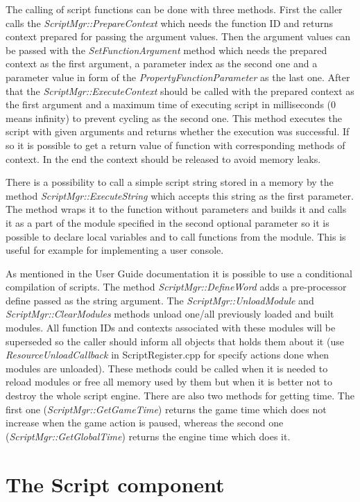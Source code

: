 \documentclass[a4paper, 12pt]{report}
\begin{document}
The calling of script functions can be done with three methods. First the caller calls the \emph{ScriptMgr::PrepareContext} which needs the function ID and returns context prepared for passing the argument values. Then the argument values can be passed with the \emph{SetFunctionArgument} method which needs the prepared context as the first argument, a parameter index as the second one and a parameter value in form of the \emph{PropertyFunctionParameter} as the last one. After that the \emph{ScriptMgr::ExecuteContext} should be called with the prepared context as the first argument and a maximum time of executing script in milliseconds (0 means infinity) to prevent cycling as the second one. This method executes the script with given arguments and returns whether the execution was successful. If so it is possible to get a return value of function with corresponding methods of context. In the end the context should be released to avoid memory leaks.

There is a possibility to call a simple script string stored in a memory by the method \emph{ScriptMgr::ExecuteString} which accepts this string as the first parameter. The method wraps it to the function without parameters and builds it and calls it as a part of the module specified in the second optional parameter so it is possible to declare local variables and to call functions from the module. This is useful for example for implementing a user console.

As mentioned in the User Guide documentation
it is possible to use a conditional compilation of scripts. The method \emph{ScriptMgr::DefineWord} adds a pre-processor define passed as the string argument. The \emph{ScriptMgr::UnloadModule} and \emph{ScriptMgr::ClearModules} methods unload one/all previously loaded and built modules. All function IDs and contexts associated with these modules will be superseded so the caller should inform all objects that holds them about it (use \emph{ResourceUnloadCallback} in ScriptRegister.cpp for specify actions done when modules are unloaded). These methods could be called when it is needed to reload modules or free all memory used by them but when it is better not to destroy the whole script engine. There are also two methods for getting time. The first one (\emph{ScriptMgr::GetGameTime}) returns the game time which does not increase when the game action is paused, whereas the second one (\emph{ScriptMgr::GetGlobalTime}) returns the engine time which does it.

\section{The Script component}
\label{sec:script-component}
\end{document}
